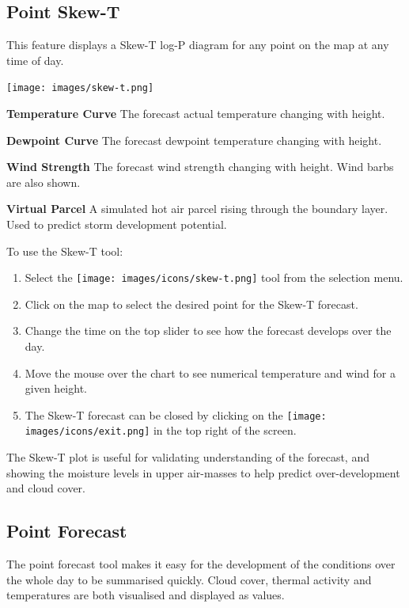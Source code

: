 \documentclass[11pt,a4paper]{article}
\begin{document}
\subsection{Point Skew-T}
This feature displays a Skew-T log-P diagram for any point on the map at any time of day.
\begin{center}
\texttt{[image: images/skew-t.png]}
\end{center}
\begin{arrow_red}
\item \textbf{Temperature Curve} The forecast actual temperature changing with height.
\end{arrow_red}
\begin{arrow_green}
\item \textbf{Dewpoint Curve} The forecast dewpoint temperature changing with height.
\end{arrow_green}
\begin{arrow_blue}
\item \textbf{Wind Strength} The forecast wind strength changing with height. Wind barbs are also shown.
\end{arrow_blue}
\begin{arrow_pink}
\item \textbf{Virtual Parcel} A simulated hot air parcel rising through the boundary layer. Used to predict storm development potential.
\end{arrow_pink}
To use the Skew-T tool:
\begin{enumerate}
\item Select the \texttt{[image: images/icons/skew-t.png]} tool from the selection menu.
\item Click on the map to select the desired point for the Skew-T forecast. 
\item Change the time on the top slider to see how the forecast develops over the day.
\item Move the mouse over the chart to see numerical temperature and wind for a given height.
\item The Skew-T forecast can be closed by clicking on the \texttt{[image: images/icons/exit.png]} in the top right of the screen.
\end{enumerate}
\begin{tip}
\item The Skew-T plot is useful for validating understanding of the forecast, and showing the moisture levels in upper air-masses to help predict over-development and cloud cover.
\end{tip}
\subsection{Point Forecast}
The point forecast tool makes it easy for the development of the conditions over the whole day to be summarised quickly. Cloud cover, thermal activity and temperatures are both visualised and displayed as values.
\end{document}
